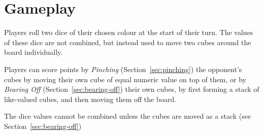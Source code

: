 \section{Gameplay}
Players roll two dice of their chosen colour at the start of their turn.
The values of these dice are not combined, but instead used to move two cubes around the board individually.

Players can score points by \textit{Pinching} (Section~\ref{sec:pinching}) the opponent's cubes by moving their own cube of equal numeric value on top of them, or by \textit{Bearing Off} (Section~\ref{sec:bearing-off}) their own cubes, by first forming a stack of like-valued cubes, and then moving them off the board.

\note The dice values cannot be combined unless the cubes are moved as a stack (see Section~\ref{sec:bearing-off})





